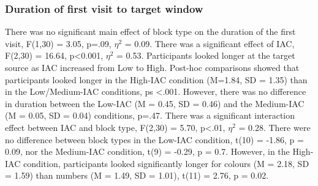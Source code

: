 \subsubsection{Duration of first visit to target window}
There was no significant main effect of block type on the duration of the first visit, F(1,30) = 3.05, p=.09, $\eta^2$  = 0.09. There was a significant effect of IAC, F(2,30) = 16.64, p<0.001, $\eta^2$  = 0.53. Participants looked longer at the target source as IAC increased from Low to High. Post-hoc comparisons showed that participants looked longer in the High-IAC condition (M=1.84, SD = 1.35) than in the Low/Medium-IAC conditions, ps <.001. However, there was no difference in duration between the Low-IAC (M = 0.45, SD = 0.46) and the Medium-IAC (M = 0.05, SD = 0.04) conditions, p=.47. There was a significant interaction effect between IAC and block type, F(2,30) = 5.70, p<.01, $\eta^2$  = 0.28. There were no difference between block types in the Low-IAC condition, t(10) = -1.86, p = 0.09, nor the Medium-IAC condition, t(9) = -0.29, p = 0.7. However, in the High-IAC condition, participants looked significantly longer for colours (M = 2.18, SD = 1.59) than numbers (M = 1.49, SD = 1.01), t(11) = 2.76, p = 0.02.

